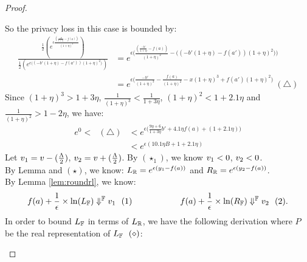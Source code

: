 \documentclass[a4paper,11pt]{article}
\begin{document}
\begin{proof}
\begin{itemize}
		So the privacy loss in this case is bounded by:
		\[
		\begin{array}{ll}
		\frac
		{\frac{1}{2}(e^{\epsilon 
		\frac{(\frac{-b'}{1 + \eta} - f(a))}{(1 + \eta)^2}})}
		{\frac{1}{2}(e^{\epsilon 
		\big((-b'(1 + \eta) - f(a'))(1 + \eta)^2 \big)})}
		& = e^{\epsilon
		\bigg(
		\frac{(\frac{-b'}{1 + \eta} - f(a))}{(1 + \eta)^2}
		-
		\big((-b'(1 + \eta) - f(a'))(1 + \eta)^2 \big)
		\bigg)}\\
		& = e^{\epsilon
		\bigg(
		\frac{-b'}{(1 + \eta)^3} - \frac{f(a)}{(1 + \eta)^2}
		-
		x(1 + \eta)^3 + f(a')(1 + \eta)^2 
		\bigg)} ~ (\triangle)
		\end{array}
		\]
		Since $ (1 + \eta)^3 > 1 + 3\eta$,  $\frac{1}{(1 + \eta)^3} < \frac{1}{1 + 3\eta} $, $(1 + \eta)^2 < 1 + 2.1\eta$ and $\frac{1}{(1 + \eta)^2} > 1 - 2 \eta$, we have:
		\[
		\begin{array}{ll}
		e^0
		<
		~~~ (\triangle) & < e^{\epsilon \big( 
		\frac{9\eta + 6}{1 + 3\eta} b'
		+ 4.1 \eta f(a)
		+ (1 + 2.1\eta) 
		\big)}\\
		& < e^{\epsilon(10.1 \eta B + 1 + 2.1\eta)}
		\end{array}
		\]
		Let $\valv_1 = \valv - (\frac{\Lambda}{2})$,
		$\valv_2 = \valv + (\frac{\Lambda}{2})$.
		By $(\star_1)$, 
		we know $\valv_1 < 0$, $\valv_2 < 0$.
		\\
		By Lemma and $(\star) $, we know: $\rvalL = e^{\epsilon(y_1 - f(a))}$ and 
		$\rvalR = e^{\epsilon(y_2 - f(a))}$.
		\\
		By Lemma \ref{lem:roundrl}, we know:
		$$f(a) + \frac{1}{\epsilon} \times \ln(\fvalL) \fbigstep \valv_1 ~~ (1)
		~~~~~~~~~~~~~~~~~
		f(a) + \frac{1}{\epsilon} \times \ln(\fvalR) \fbigstep \valv_2 ~~ (2).$$
	In order to bound $\fvalL$ in terms of $\rvalL$, we have the following derivation where $P$ be the real representation of $\fvalL ~~ (\diamond)$:
{\scriptsize
\begin{mathpar}
\end{mathpar}}
\end{itemize}
\end{proof}
\end{document}
